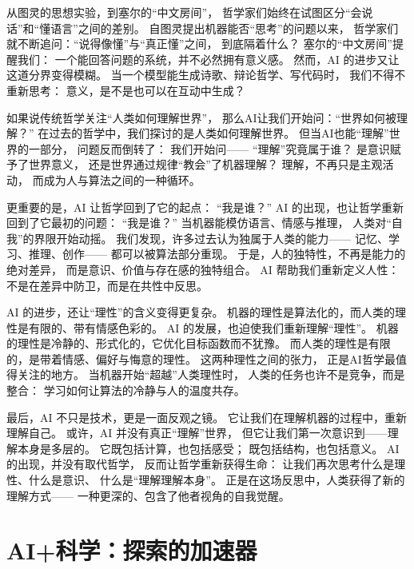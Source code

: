 从图灵的思想实验，到塞尔的“中文房间”，  
哲学家们始终在试图区分“会说话”和“懂语言”之间的差别。  
自图灵提出机器能否“思考”的问题以来，  
哲学家们就不断追问：“说得像懂”与“真正懂”之间，  
到底隔着什么？  
塞尔的“中文房间”提醒我们：  
一个能回答问题的系统，并不必然拥有意义感。  
然而，AI 的进步又让这道分界变得模糊。  
当一个模型能生成诗歌、辩论哲学、写代码时，  
我们不得不重新思考：  
意义，是不是也可以在互动中生成？

如果说传统哲学关注“人类如何理解世界”，  
那么AI让我们开始问：“世界如何被理解？”  
在过去的哲学中，我们探讨的是人类如何理解世界。  
但当AI也能“理解”世界的一部分，  
问题反而倒转了：  
我们开始问——  
“理解”究竟属于谁？  
是意识赋予了世界意义，  
还是世界通过规律“教会”了机器理解？  
理解，不再只是主观活动，  
而成为人与算法之间的一种循环。

更重要的是，AI 让哲学回到了它的起点：  
“我是谁？”  
AI 的出现，也让哲学重新回到了它最初的问题：  
“我是谁？”  
当机器能模仿语言、情感与推理，  
人类对“自我”的界限开始动摇。  
我们发现，许多过去认为独属于人类的能力——  
记忆、学习、推理、创作——  
都可以被算法部分重现。  
于是，人的独特性，不再是能力的绝对差异，  
而是意识、价值与存在感的独特组合。  
AI 帮助我们重新定义人性：  
不是在差异中防卫，而是在共性中反思。

AI 的进步，还让“理性”的含义变得更复杂。  
机器的理性是算法化的，而人类的理性是有限的、带有情感色彩的。  
AI 的发展，也迫使我们重新理解“理性”。  
机器的理性是冷静的、形式化的，它优化目标函数而不犹豫。  
而人类的理性是有限的，是带着情感、偏好与悔意的理性。  
这两种理性之间的张力，  
正是AI哲学最值得关注的地方。  
当机器开始“超越”人类理性时，  
人类的任务也许不是竞争，而是整合：  
学习如何让算法的冷静与人的温度共存。

最后，AI 不只是技术，更是一面反观之镜。  
它让我们在理解机器的过程中，重新理解自己。  
或许，AI 并没有真正“理解”世界，  
但它让我们第一次意识到——理解本身是多层的。  
它既包括计算，也包括感受；  
既包括结构，也包括意义。  
AI 的出现，并没有取代哲学，  
反而让哲学重新获得生命：  
让我们再次思考什么是理性、什么是意识、  
什么是“理解理解本身”。  
正是在这场反思中，人类获得了新的理解方式——  
一种更深的、包含了他者视角的自我觉醒。

\section{AI+科学：探索的加速器}

